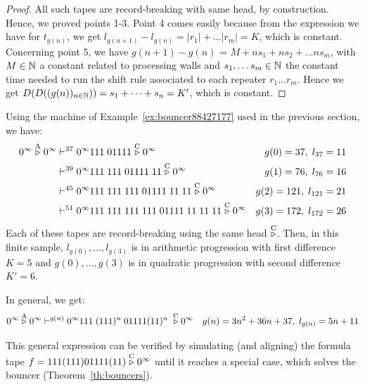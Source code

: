 \begin{proof}
    All such tapes are record-breaking with same head, by construction. Hence, we proved points 1-3. Point 4 comes easily because from the expression we have for $t_{g(n)}$, we get $l_{g(n+1)} - l_{g(n)} = |r_1| + \dots |r_m| = K$, which is constant. Concerning point 5, we have $g(n+1)-g(n)$ = $M + ns_1 + ns_2 + \dots ns_m$, with $M\in\mathbb{N}$ a constant related to processing walls and $s_1, \dots s_m \in \mathbb{N}$ the constant time needed to run the shift rule associated to each repeater $r_1 \dots r_m$. Hence we get $D(D((g(n))_{n\in\mathbb{N}})) = s_1+\dots + s_n = K'$, which is constant.


\end{proof}


\begin{example}\label{ex:linquad}
    Using the machine of Example~\ref{ex:bouncer88427177} used in the previous section, we have:
    \begin{align*}
        0^\infty \stackrel{\text{A}}\triangleright 0^\infty & \vdash^{37} 0^\infty 111\; 01111 \stackrel{\text{C}}\triangleright 0^\infty                                 & g(0) = 37,\; l_{37} = 11   \\
                                           & \vdash^{39}   0^\infty111\; 111 \;01111 \;11\stackrel{\text{C}}\triangleright0^\infty                       & g(1) = 76,\; l_{76} = 16   \\
                                           & \vdash^{45}   0^\infty111\; 111\;111\; 01111\; 11\; 11 \stackrel{\text{C}}\triangleright0^\infty            & g(2) = 121,\; l_{121} = 21 \\
                                           & \vdash^{51}   0^\infty111\; 111\;111\; 111\; 01111\; 11\; 11\; 11 \stackrel{\text{C}}\triangleright0^\infty & g(3) = 172,\; l_{172} = 26 \\
    \end{align*}
    Each of these tapes are record-breaking using the same head $\stackrel{\text{C}}\triangleright$. Then, in this finite sample, $l_{g(0)},...,l_{g(3)}$ is in arithmetic progression with first difference $K=5$ and $g(0), ..., g(3)$ is in quadratic progression with second difference $K'=6$.

    In general, we get:
    $$0^\infty \stackrel{\text{A}}\triangleright 0^\infty  \vdash^{g(n)} 0^\infty 111\; (111)^n\; 01111 (11)^n\; \stackrel{\text{C}}\triangleright 0^\infty   \quad g(n) = 3n^2 + 36n + 37,\; l_{g(n)} = 5n+11$$

    This general expression can be verified by simulating (and aligning) the formula tape $f=111(111)01111(11)\stackrel{\text{C}}\triangleright0^\infty$ until it reaches a special case, which solves the bouncer (Theorem~\ref{th:bouncers}).

\end{example}


